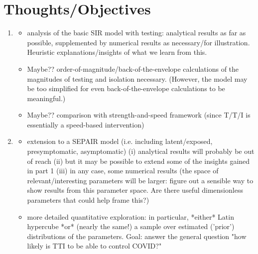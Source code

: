 \documentclass{article}\usepackage[]{graphicx}\usepackage[]{color}
\begin{document}
\section{Thoughts/Objectives}



\begin{enumerate}
\item 
\begin{itemize}
\item analysis of the basic SIR model with testing: analytical results as far as possible, supplemented by numerical results as necessary/for illustration. Heuristic explanations/insights of what we learn from this.
\item Maybe?? order-of-magnitude/back-of-the-envelope calculations of the magnitudes of testing and isolation necessary. (However, the model may be too simplified for even back-of-the-envelope calculations to be meaningful.)
\item Maybe?? comparison with strength-and-speed framework (since T/T/I is essentially a speed-based intervention)
\end{itemize}

\item
\begin{itemize}
\item extension to a SEPAIR model (i.e. including latent/exposed, presymptomatic, asymptomatic)
  (i) analytical results will probably be out of reach
	(ii) but it may be possible to extend some of the insights gained in part 1
	(iii) in any case, some numerical results (the space of relevant/interesting parameters will be larger: figure out a sensible way to show results from this parameter space. Are there useful dimensionless parameters that could help frame this?)
\item more detailed quantitative exploration: in particular, *either* Latin hypercube *or* (nearly the same!) a sample over estimated ('prior') distributions of the parameters. Goal: answer the general question "how likely is TTI to be able to control COVID?"
\end{itemize}
\end{enumerate}




\end{document}
